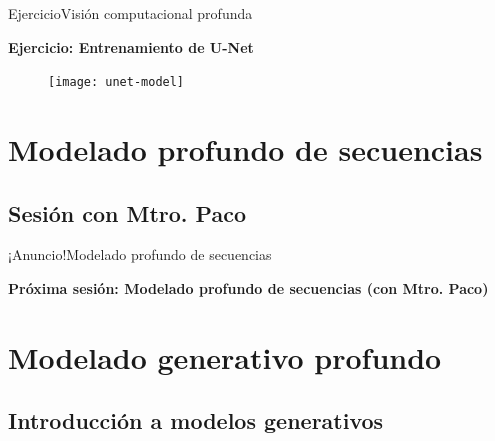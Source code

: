\documentclass[10pt,border=3pt,tikz]{beamer}
\begin{document}
    {
        
    }
    
    \begin{frame}{Ejercicio}{Visión computacional profunda}
        \begin{center}
            {\Large \textbf{Ejercicio: Entrenamiento de U-Net}}
        \end{center}
        \begin{figure}
            \centering
            \texttt{[image: unet-model]}
        \end{figure}
    \end{frame}
    
    \section{Modelado profundo de secuencias}
    \subsection{Sesión con Mtro. Paco}
    
    \begin{frame}{¡Anuncio!}{Modelado profundo de secuencias}
        \begin{center}
            {\Large \textbf{Próxima sesión: Modelado profundo de secuencias (con Mtro. Paco)}}
        \end{center}
    \end{frame}
    
    
    \section{Modelado generativo profundo}
    \subsection{Introducción a modelos generativos}
    
\end{document}
